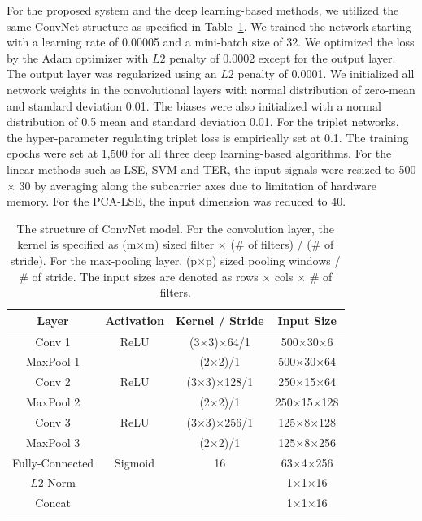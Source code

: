 \documentclass[sigconf]{acmart}
\begin{document}
For the proposed system and the deep learning-based methods, we utilized the same ConvNet structure as specified in Table~\ref{tab1}. We trained the network starting with a learning rate of 0.00005 and a mini-batch size of 32. We optimized the loss by the Adam optimizer with $L2$ penalty of 0.0002 except for the output layer. The output layer was regularized using an $L2$ penalty of 0.0001. We initialized all network weights in the convolutional layers with normal distribution of zero-mean and standard deviation 0.01. The biases were also initialized with a normal distribution of 0.5 mean and standard deviation 0.01. For the triplet networks, the hyper-parameter regulating triplet loss is empirically set at 0.1. The training epochs were set at 1,500 for all three deep learning-based algorithms. For the linear methods such as LSE, SVM and TER, the input signals were resized to 500 $\times$ 30 by averaging along the subcarrier axes due to limitation of hardware memory. For the PCA-LSE, the input dimension was reduced to 40.
\begin{table}
    \caption{The structure of ConvNet model. For the convolution layer, the kernel is specified as (m$\times$m) sized filter $\times$ (\# of filters) / (\# of stride). For the max-pooling layer, (p$\times$p) sized pooling windows / \# of stride. The input sizes are denoted as rows $\times$ cols $\times$ \# of filters.}
    \label{tab1}
    \begin{tabular}{cccc}
     \toprule
     Layer     & Activation & Kernel / Stride & Input Size \\
     \midrule
     Conv 1    & ReLU       & (3$\times$3)$\times$64/1      & 500$\times$30$\times$6   \\
     MaxPool 1 &            & (2$\times$2)/1         & 500$\times$30$\times$64  \\
     Conv 2    & ReLU       & (3$\times$3)$\times$128/1     & 250$\times$15$\times$64 \\
     MaxPool 2 &            & (2$\times$2)/1         & 250$\times$15$\times$128 \\
     Conv 3    & ReLU       & (3$\times$3)$\times$256/1     & 125$\times$8$\times$128  \\
     MaxPool 3 &            & (2$\times$2)/1         & 125$\times$8$\times$256  \\
     Fully-Connected     & Sigmoid    & 16             & 63$\times$4$\times$256   \\
     $L2$ Norm  &            &                 & 1$\times$1$\times$16    \\
     Concat    &            &                 & 1$\times$1$\times$16    \\
     \bottomrule
    \end{tabular}
\end{table}
\end{document}
